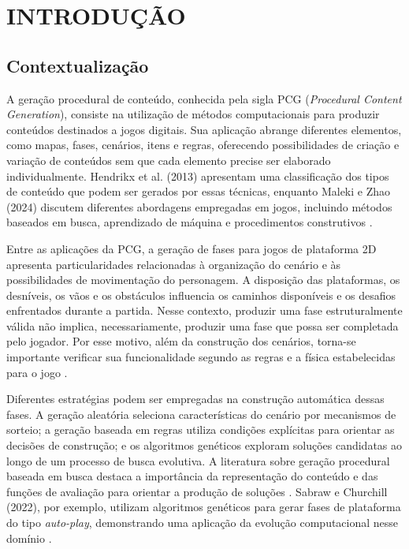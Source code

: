 \chapter{INTRODUÇÃO}

\section{Contextualização}

A geração procedural de conteúdo, conhecida pela sigla PCG 
(\textit{Procedural Content Generation}), consiste na utilização de métodos 
computacionais para produzir conteúdos destinados a jogos digitais. 
Sua aplicação abrange diferentes elementos, como mapas, fases, cenários, 
itens e regras, oferecendo possibilidades de criação e variação de conteúdos 
sem que cada elemento precise ser elaborado individualmente. 
Hendrikx et al. (2013) apresentam uma classificação dos tipos de conteúdo 
que podem ser gerados por essas técnicas, enquanto Maleki e Zhao (2024) 
discutem diferentes abordagens empregadas em jogos, incluindo métodos baseados 
em busca, aprendizado de máquina e procedimentos construtivos 
\cite{Hendrikx2013,MalekiZhao2024}.

Entre as aplicações da PCG, a geração de fases para jogos de plataforma 2D 
apresenta particularidades relacionadas à organização do cenário e às 
possibilidades de movimentação do personagem. A disposição das plataformas, 
os desníveis, os vãos e os obstáculos influencia os caminhos disponíveis e os 
desafios enfrentados durante a partida. Nesse contexto, produzir uma fase 
estruturalmente válida não implica, necessariamente, produzir uma fase que 
possa ser completada pelo jogador. Por esse motivo, além da construção dos 
cenários, torna-se importante verificar sua funcionalidade segundo as regras 
e a física estabelecidas para o jogo \cite{SabrawChurchill2022,SchaaBarriga2024}.

Diferentes estratégias podem ser empregadas na construção automática dessas 
fases. A geração aleatória seleciona características do cenário por mecanismos 
de sorteio; a geração baseada em regras utiliza condições explícitas para 
orientar as decisões de construção; e os algoritmos genéticos exploram 
soluções candidatas ao longo de um processo de busca evolutiva. A literatura 
sobre geração procedural baseada em busca destaca a importância da 
representação do conteúdo e das funções de avaliação para orientar a produção 
de soluções \cite{Togelius2011,TogeliusSearch2016}. Sabraw e Churchill (2022), 
por exemplo, utilizam algoritmos genéticos para gerar fases de plataforma do 
tipo \textit{auto-play}, demonstrando uma aplicação da evolução computacional 
nesse domínio \cite{SabrawChurchill2022}.

